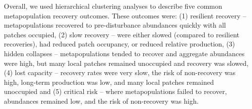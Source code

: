 \documentclass[
]{article}
\begin{document}
Overall, we used hierarchical clustering analyses to describe five
common metapopulation recovery outcomes. These outcomes were: (1)
resilient recovery -- metapopulations recovered to pre-disturbance
abundances quickly with all patches occupied, (2) slow recovery -- were
either slowed (compared to resilient recoveries), had reduced patch
occupancy, or reduced relative production, (3) hidden collapses --
metapopulations tended to recover and aggregate abundances were high,
but many local patches remained unoccupied and recovery was slowed, (4)
lost capacity -- recovery rates were very slow, the risk of non-recovery
was high, long-term production was low, and many local patches remained
unoccupied and (5) critical risk -- where metapopulations failed to
recover, abundances remained low, and the risk of non-recovery was high.
\end{document}

